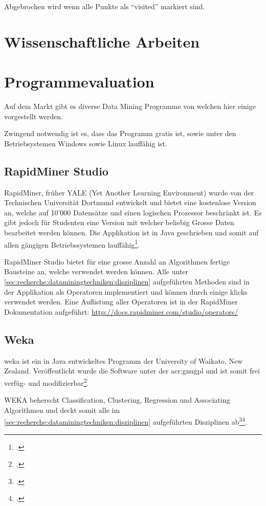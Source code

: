 Abgebrochen wird wenn alle Punkte als "`visited"' markiert sind.

\section{Wissenschaftliche Arbeiten}
\todo{}

\section{Programmevaluation}
\label{sec:recherche:programmevaluation}
Auf dem Markt gibt es diverse Data Mining Programme von welchen hier einige vorgestellt werden.

Zwingend notwendig ist es, dass das Programm gratis ist, sowie unter den Betriebsystemen Windows sowie Linux lauffähig ist. 


\subsection{RapidMiner Studio}
RapidMiner, früher YALE (Yet Another Learning Environment) wurde von der Technischen Universität Dortmund entwickelt und bietet eine kostenlose Version an, welche auf 10'000 Datensätze und einen logischen Prozessor beschränkt ist. Es gibt jedoch für Studenten eine Version mit welcher beliebig Grosse Daten bearbeitet werden können. Die Applikation ist in Java geschrieben und somit auf allen gängigen Betriebssystemen lauffähig\footcite{RapidMiner_Studio_2017-01-14}.

RapidMiner Studio bietet für eine grosse Anzahl an Algorithmen fertige Bausteine an, welche verwendet werden können. Alle unter \cref{sec:recherche:dataminingtechniken:disziplinen} aufgeführten Methoden sind in der Applikation als Operatoren implementiert und können durch einige klicks verwendet werden. Eine Auflistung aller Operatoren ist in der RapidMiner Dokumentation aufgeführt: \url{http://docs.rapidminer.com/studio/operators/}

\subsection{Weka}
\gls{weka} ist ein in Java entwickeltes Programm der University of Waikato, New Zealand. Veröffentlicht wurde die Software unter der \gls{acr:gnugpl} und ist somit frei verfüg- und modifizierbar\footcite{Weka_2017-01-14}.

WEKA beherscht Classification, Clustering, Regression und Associating Algorithmen und deckt somit alle  im \cref{sec:recherche:dataminingtechniken:disziplinen} aufgeführten Disziplinen ab\footcite{Weka_Doc_2017-01-14}\footcite{Weka_Regression_2017-01-14}.

